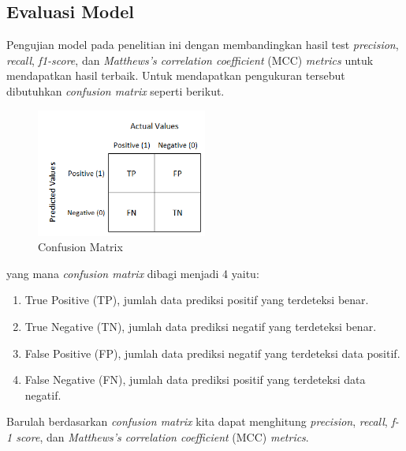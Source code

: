 \subsection{Evaluasi Model} \label{II.evaluasimodel}
Pengujian model pada penelitian ini dengan membandingkan hasil test \textit{precision}, \textit{recall}, \textit{f1-score}, dan \textit{Matthews’s correlation coefficient} (MCC) \textit{metrics} untuk mendapatkan hasil terbaik. Untuk mendapatkan pengukuran tersebut dibutuhkan \textit{confusion matrix} seperti berikut.
\begin{figure}[H]
	\centering
	\includegraphics[width=0.5\textwidth]{figure/confusion_matrix.png}
	\caption{Confusion Matrix}
	\label{fig:2.confusionmatrix}
\end{figure}
yang mana \textit{confusion matrix} dibagi menjadi 4 yaitu:
\begin{enumerate}[noitemsep]
    \item True Positive (TP), jumlah data prediksi positif yang terdeteksi benar.
    \item True Negative (TN), jumlah data prediksi negatif yang terdeteksi benar.
    \item False Positive (FP), jumlah data prediksi negatif yang terdeteksi data positif.
    \item False Negative (FN), jumlah data prediksi positif yang terdeteksi data negatif.
\end{enumerate}
Barulah berdasarkan \textit{confusion matrix} kita dapat menghitung \textit{precision}, \textit{recall},     \textit{f-1 score}, dan \textit{Matthews’s correlation coefficient} (MCC) \textit{metrics}.

